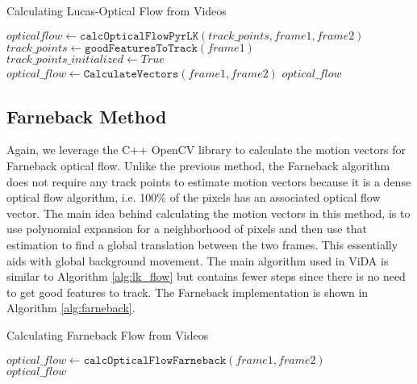 \begin{algorithm}
\caption{Calculating Lucas-Optical Flow from Videos}
\label{alg:lk_flow}
\begin{algorithmic}[1]
  	\State $opticalflow \gets \texttt{calcOpticalFlowPyrLK}(track\_points, frame1, frame2)$
  \Else
  	\State $track\_points \gets \texttt{goodFeaturesToTrack}(frame1)$
	\State $track\_points\_initialized \gets True$
	\State $optical\_flow \gets  \texttt{CalculateVectors}(frame1, frame2)$
  \EndIf
  \Return $optical\_flow$
\EndProcedure
\end{algorithmic}
\end{algorithm}

\subsection{\label{subsection:farneback_method} Farneback Method}
Again, we leverage the C++ OpenCV library to calculate the motion vectors for
Farneback optical flow. Unlike the previous method, the Farneback algorithm does not require
any track points to estimate motion vectors because it is a dense optical flow
algorithm, i.e. 100\% of the pixels has an associated optical flow vector. The
main idea behind calculating the motion vectors in this method, is to use
polynomial expansion for a neighborhood of pixels \cite{farneback2003two} and
then use that estimation to find a global translation between the two frames. This
essentially aids with global background movement. The main algorithm used in ViDA
is similar to Algorithm \ref{alg:lk_flow} but contains fewer steps since there
is no need to get good features to track. The Farneback implementation is shown
in Algorithm \ref{alg:farneback}.

\begin{algorithm}
\caption{Calculating Farneback Flow from Videos}
\label{alg:farneback}
\begin{algorithmic}[1]
  \State $optical\_flow \gets \texttt{calcOpticalFlowFarneback}(frame1, frame2)$\\
  \Return $optical\_flow$
\EndProcedure
\end{algorithmic}
\end{algorithm}
